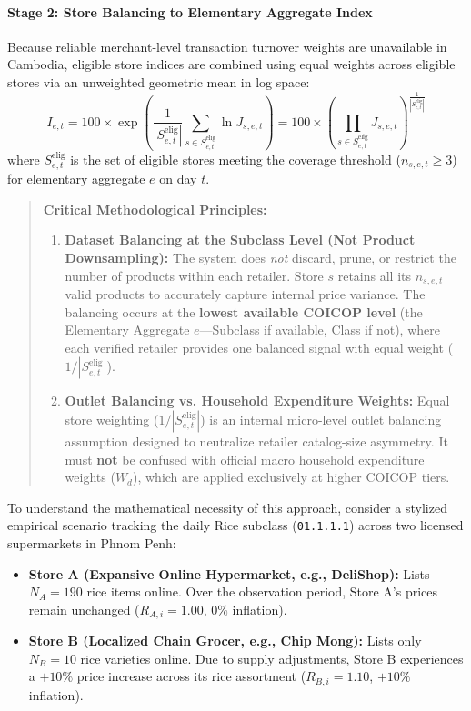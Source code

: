 \paragraph{Stage 2: Store Balancing to Elementary Aggregate Index}
Because reliable merchant-level transaction turnover weights are unavailable in Cambodia, eligible store indices are combined using equal weights across eligible stores via an unweighted geometric mean in log space:
\begin{equation}
    I_{e, t} = 100 \times \exp\left( \frac{1}{|S_{e, t}^{\text{elig}}|} \sum_{s \in S_{e, t}^{\text{elig}}} \ln J_{s, e, t} \right) = 100 \times \left( \prod_{s \in S_{e, t}^{\text{elig}}} J_{s, e, t} \right)^{\frac{1}{|S_{e, t}^{\text{elig}}|}}
\end{equation}
where $S_{e, t}^{\text{elig}}$ is the set of eligible stores meeting the coverage threshold ($n_{s, e, t} \ge 3$) for elementary aggregate $e$ on day $t$.

\begin{quote}
\textbf{Critical Methodological Principles:}
\begin{enumerate}
    \item \textbf{Dataset Balancing at the Subclass Level (Not Product Downsampling):} The system does \textit{not} discard, prune, or restrict the number of products within each retailer. Store $s$ retains all its $n_{s, e, t}$ valid products to accurately capture internal price variance. The balancing occurs at the \textbf{lowest available COICOP level} (the Elementary Aggregate $e$---Subclass if available, Class if not), where each verified retailer provides one balanced signal with equal weight ($1/|S_{e, t}^{\text{elig}}|$).
    \item \textbf{Outlet Balancing vs. Household Expenditure Weights:} Equal store weighting ($1/|S_{e, t}^{\text{elig}}|$) is an internal micro-level outlet balancing assumption designed to neutralize retailer catalog-size asymmetry. It must \textbf{not} be confused with official macro household expenditure weights ($W_d$), which are applied exclusively at higher COICOP tiers.
\end{enumerate}
\end{quote}

\hs To understand the mathematical necessity of this approach, consider a stylized empirical scenario tracking the daily Rice subclass (\texttt{01.1.1.1}) across two licensed supermarkets in Phnom Penh:
\begin{itemize}
    \item \textbf{Store A (Expansive Online Hypermarket, e.g., DeliShop):} Lists $N_A = 190$ rice items online. Over the observation period, Store A's prices remain unchanged ($R_{A, i} = 1.00$, $0\%$ inflation).
    \item \textbf{Store B (Localized Chain Grocer, e.g., Chip Mong):} Lists only $N_B = 10$ rice varieties online. Due to supply adjustments, Store B experiences a $+10\%$ price increase across its rice assortment ($R_{B, i} = 1.10$, $+10\%$ inflation).
\end{itemize}

